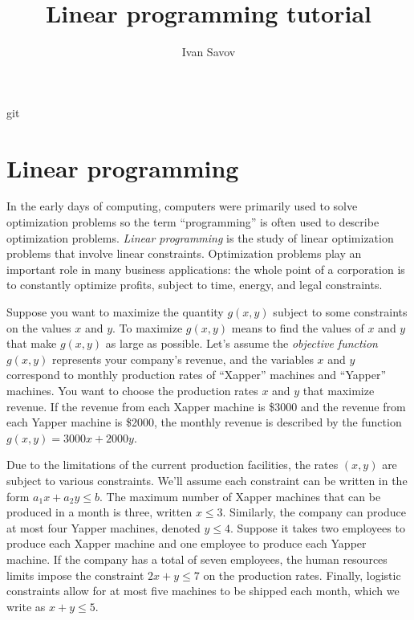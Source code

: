 \documentclass[11pt,oneside]{article}
\title{ {\huge \sc Linear programming tutorial} }
\author{Ivan Savov}
\begin{document}
\maketitle 

\vspace{-1cm}
\noindent

{ \center
	git \gitrevisionnumber 

}

\vspace{1cm}

\setcounter{tocdepth}{2}
\setcounter{secnumdepth}{2}
\tableofcontents

\vspace{1cm}

\section{Linear programming}
\label{applications:linear_programming}

	In  the early days of computing, 
	computers were primarily used to solve optimization problems
	so the term ``programming'' is often used to describe optimization problems.
	\emph{Linear programming} is the study of linear optimization problems that involve linear constraints.
	Optimization problems play an important role in many business applications:
	the whole point of a corporation is to constantly optimize profits,
	subject to time, energy, and legal constraints. 
	
	Suppose you want to maximize the quantity $g(x,y)$ subject to some constraints on the values $x$ and $y$.
	To maximize $g(x,y)$ means  to find the values of $x$ and $y$ that make $g(x,y)$ as large as possible.
	Let's assume the \emph{objective function} $g(x,y)$ represents your company's revenue,
	and the variables $x$ and $y$ correspond to monthly production rates of ``Xapper'' machines and ``Yapper'' machines.
	You want to choose the production rates $x$ and $y$ that maximize revenue.
	If the revenue from each Xapper machine is \$3000 and the revenue from each Yapper machine is \$2000,
	the monthly revenue is described by the function $g(x,y) = 3000x +  2000y$. 

	Due to the limitations of the current production facilities,
	the rates $(x,y)$ are subject to various constraints.
	We'll assume each constraint can be written in the form $a_1x+a_2y \leq b$.
	The maximum number of Xapper machines that can be produced in a month is three, written $x\leq3$.
	Similarly, the company can produce at most four Yapper machines, denoted $y \leq 4$.
	Suppose it takes two employees to produce each Xapper machine and one employee to produce each Yapper machine.
	If the company has a total of seven employees,  %
	the human resources limits impose the constraint $2x+y \leq 7$ on the production rates.
	Finally, logistic constraints allow for at most five machines to be shipped each month, which we write as $x+y \leq 5$.
\end{document}
